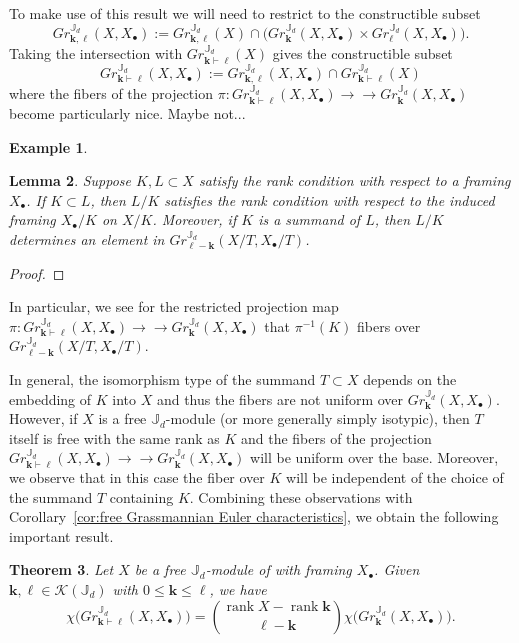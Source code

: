 \documentclass{amsart}
\numberwithin{equation}{section}
\newtheorem{theorem}{Theorem}[section]
\newtheorem{lemma}[theorem]{Lemma}
\theoremstyle{definition}
\newtheorem{example}[theorem]{Example}
\def\JJ{\mathbb{J}}
\def\bfk{\mathbf{k}}
\def\bfl{{\ensuremath{\boldsymbol\ell}}}
\def\cK{\mathcal{K}}
\def\rank{\operatorname{rank}}
\newcommand{\partition}{\vdash}
\newcommand{\onto}{\to\!\!\!\!\!\to}
\begin{document}
To make use of this result we will need to restrict to the constructible subset
\[Gr^{\JJ_d}_{\bfk,\bfl}(X,X_\bullet):=Gr^{\JJ_d}_{\bfk,\bfl}(X)\cap\big(Gr^{\JJ_d}_\bfk(X,X_\bullet)\times Gr^{\JJ_d}_\bfl(X,X_\bullet)\big).\]
Taking the intersection with $Gr^{\JJ_d}_{\bfk\partition\bfl}(X)$ gives the constructible subset 
\[Gr^{\JJ_d}_{\bfk\partition\bfl}(X,X_\bullet):=Gr^{\JJ_d}_{\bfk,\bfl}(X,X_\bullet)\cap Gr^{\JJ_d}_{\bfk\partition\bfl}(X)\]
where the fibers of the projection $\pi:Gr^{\JJ_d}_{\bfk\partition\bfl}(X,X_\bullet)\onto Gr^{\JJ_d}_\bfk(X,X_\bullet)$ become particularly nice.  Maybe not...
\begin{example}
  
\end{example}
\begin{lemma}
  Suppose $K,L\subset X$ satisfy the rank condition with respect to a framing $X_\bullet$.  If $K\subset L$, then $L/K$ satisfies the rank condition with respect to the induced framing $X_\bullet/K$ on $X/K$.  Moreover, if $K$ is a summand of $L$, then $L/K$ determines an element in $Gr^{\JJ_d}_{\bfl-\bfk}(X/T,X_\bullet/T)$.
\end{lemma}
\begin{proof}

\end{proof}
In particular, we see for the restricted projection map $\pi:Gr^{\JJ_d}_{\bfk\partition\bfl}(X,X_\bullet)\onto Gr^{\JJ_d}_\bfk(X,X_\bullet)$ that $\pi^{-1}(K)$ fibers over $Gr^{\JJ_d}_{\bfl-\bfk}(X/T,X_\bullet/T)$.

In general, the isomorphism type of the summand $T\subset X$ depends on the embedding of $K$ into $X$ and thus the fibers are not uniform over $Gr^{\JJ_d}_\bfk(X,X_\bullet)$.  However, if $X$ is a free $\JJ_d$-module (or more generally simply isotypic), then $T$ itself is free with the same rank as $K$ and the fibers of the projection $Gr^{\JJ_d}_{\bfk\partition\bfl}(X,X_\bullet)\onto Gr^{\JJ_d}_\bfk(X,X_\bullet)$ will be uniform over the base.  Moreover, we observe that in this case the fiber over $K$ will be independent of the choice of the summand $T$ containing $K$.  Combining these observations with Corollary~\ref{cor:free Grassmannian Euler characteristics}, we obtain the following important result.
\begin{theorem}
  Let $X$ be a free $\JJ_d$-module of with framing $X_\bullet$.  Given $\bfk,\bfl\in\cK(\JJ_d)$ with $0\le\bfk\le\bfl$, we have
  \begin{equation}\label{summand Grassmannian Euler characteristics}
    \chi\big(Gr^{\JJ_d}_{\bfk\partition\bfl}(X,X_\bullet)\big)={\rank X-\rank\bfk\choose \bfl-\bfk}\chi\big(Gr^{\JJ_d}_\bfk(X,X_\bullet)\big).
  \end{equation}
\end{theorem}
\end{document}

